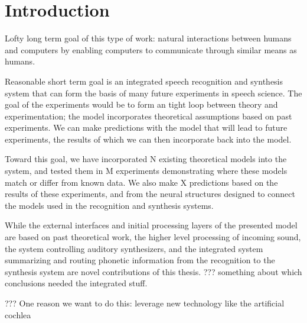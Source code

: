\chapter{Introduction}



Lofty long term goal of this type of work:
natural interactions between humans and computers
by enabling computers to communicate through
similar means as humans.

Reasonable short term goal is an integrated
speech recognition and synthesis system
that can form the basis of many future
experiments in speech science.
The goal of the experiments would be to
form an tight loop between
theory and experimentation;
the model incorporates theoretical
assumptions based on past experiments.
We can make predictions with the model
that will lead to future experiments,
the results of which we can then
incorporate back into the model.

Toward this goal,
we have incorporated N existing
theoretical models into the system,
and tested them in M experiments
demonstrating where these models
match or differ from known data.
We also make X predictions
based on the results of these experiments,
and from the neural structures
designed to connect
the models used in the recognition
and synthesis systems.

While the external interfaces
and initial processing layers of
the presented model are based on
past theoretical work,
the higher level processing
of incoming sound,
the system controlling
auditory synthesizers,
and the integrated system
summarizing and routing
phonetic information from
the recognition to the synthesis system
are novel contributions of this thesis.
??? something about which conclusions
needed the integrated stuff.

??? One reason we want to do this:
leverage new technology like the artificial cochlea
